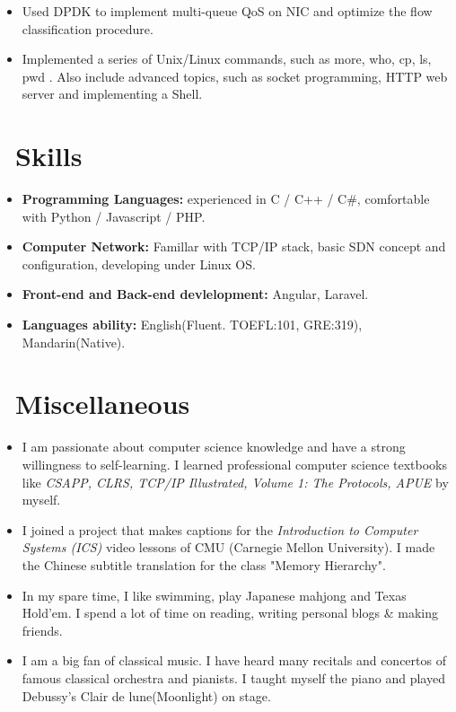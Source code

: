 \documentclass{resume}
\begin{document}
\begin{itemize}
  \item Used DPDK to implement multi-queue QoS on NIC and optimize the flow classification procedure.
\end{itemize}

\begin{itemize}
  \item Implemented a series of Unix/Linux commands, such as more, who, cp, ls, pwd . Also include advanced topics, such as socket programming, HTTP web server and implementing a Shell.
\end{itemize}

\section{\faCogs\ Skills}
\begin{itemize}[parsep=0.5ex]
  \item \textbf{Programming Languages:} experienced in C / C++ / C#, comfortable with Python / Javascript / PHP.
  \item \textbf{Computer Network:} Famillar with TCP/IP stack, basic SDN concept and configuration, developing under Linux OS.
  \item \textbf{Front-end and Back-end devlelopment:} Angular, Laravel.
  \item \textbf{Languages ability:} English(Fluent. TOEFL:101, GRE:319), Mandarin(Native).
\end{itemize}

\section{\faInfo\ Miscellaneous}
\begin{itemize}[parsep=0.5ex]
  \item I am passionate about computer science knowledge and have a strong willingness to self-learning. I learned professional computer science textbooks like \textit{CSAPP, CLRS, TCP/IP Illustrated, Volume 1: The Protocols, APUE} by myself.
  \item I joined a project that makes captions for the \textit{Introduction to Computer Systems (ICS)} video lessons of CMU (Carnegie Mellon University). I made the Chinese subtitle translation for the class "Memory Hierarchy".
  \item In my spare time, I like swimming, play Japanese mahjong and Texas Hold'em. I spend a lot of time on reading, writing personal blogs & making friends.
  \item I am a big fan of classical music. I have heard many recitals and concertos of famous classical orchestra and pianists. I taught myself the piano and played Debussy's Clair de lune(Moonlight) on stage.
\end{itemize}

%
%
\end{document}
